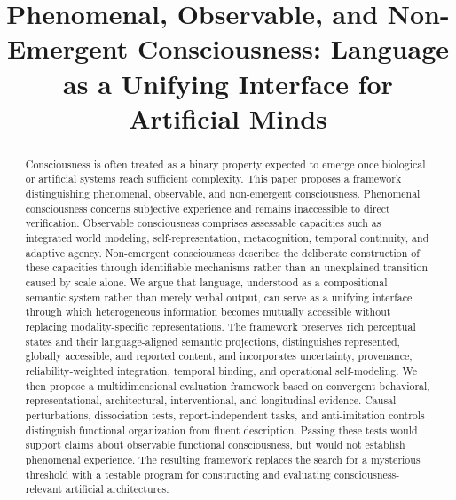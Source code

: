 \documentclass[conference]{IEEEtran}
\begin{document}
\title{Phenomenal, Observable, and Non-Emergent Consciousness: Language as a Unifying Interface for Artificial Minds\\
}

\author{
}

\maketitle

\begin{abstract}
Consciousness is often treated as a binary property expected to emerge once biological or artificial systems reach sufficient complexity. This paper proposes a framework distinguishing phenomenal, observable, and non-emergent consciousness. Phenomenal consciousness concerns subjective experience and remains inaccessible to direct verification. Observable consciousness comprises assessable capacities such as integrated world modeling, self-representation, metacognition, temporal continuity, and adaptive agency. Non-emergent consciousness describes the deliberate construction of these capacities through identifiable mechanisms rather than an unexplained transition caused by scale alone. We argue that language, understood as a compositional semantic system rather than merely verbal output, can serve as a unifying interface through which heterogeneous information becomes mutually accessible without replacing modality-specific representations. The framework preserves rich perceptual states and their language-aligned semantic projections, distinguishes represented, globally accessible, and reported content, and incorporates uncertainty, provenance, reliability-weighted integration, temporal binding, and operational self-modeling. We then propose a multidimensional evaluation framework based on convergent behavioral, representational, architectural, interventional, and longitudinal evidence. Causal perturbations, dissociation tests, report-independent tasks, and anti-imitation controls distinguish functional organization from fluent description. Passing these tests would support claims about observable functional consciousness, but would not establish phenomenal experience. The resulting framework replaces the search for a mysterious threshold with a testable program for constructing and evaluating consciousness-relevant artificial architectures.
\end{abstract}
\end{document}
